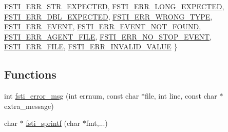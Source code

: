 \begin{DoxyCompactItemize}
\mbox{\hyperlink{fsti-error_8h_a385c44f6fb256e5716a2302a5b940388a4d34aec5d45c4f9a07a2f010034d6280}{F\+S\+T\+I\+\_\+\+E\+R\+R\+\_\+\+S\+T\+R\+\_\+\+E\+X\+P\+E\+C\+T\+ED}}, 
\mbox{\hyperlink{fsti-error_8h_a385c44f6fb256e5716a2302a5b940388a5c988ec210cd1f14e68429a5486becdd}{F\+S\+T\+I\+\_\+\+E\+R\+R\+\_\+\+L\+O\+N\+G\+\_\+\+E\+X\+P\+E\+C\+T\+ED}}, 
\mbox{\hyperlink{fsti-error_8h_a385c44f6fb256e5716a2302a5b940388a8deafa778033a6ec3f07fa31fbca574d}{F\+S\+T\+I\+\_\+\+E\+R\+R\+\_\+\+D\+B\+L\+\_\+\+E\+X\+P\+E\+C\+T\+ED}}, 
\newline
\mbox{\hyperlink{fsti-error_8h_a385c44f6fb256e5716a2302a5b940388a7ff33db1e9336968163833471c1d8efe}{F\+S\+T\+I\+\_\+\+E\+R\+R\+\_\+\+W\+R\+O\+N\+G\+\_\+\+T\+Y\+PE}}, 
\mbox{\hyperlink{fsti-error_8h_a385c44f6fb256e5716a2302a5b940388a22475acef0625db50876279560a18b2f}{F\+S\+T\+I\+\_\+\+E\+R\+R\+\_\+\+E\+V\+E\+NT}}, 
\mbox{\hyperlink{fsti-error_8h_a385c44f6fb256e5716a2302a5b940388a29607c12e78f6d945365852d63397b27}{F\+S\+T\+I\+\_\+\+E\+R\+R\+\_\+\+E\+V\+E\+N\+T\+\_\+\+N\+O\+T\+\_\+\+F\+O\+U\+ND}}, 
\mbox{\hyperlink{fsti-error_8h_a385c44f6fb256e5716a2302a5b940388ae9f4d05515e6c6a028ad4544a1c0bea7}{F\+S\+T\+I\+\_\+\+E\+R\+R\+\_\+\+A\+G\+E\+N\+T\+\_\+\+F\+I\+LE}}, 
\newline
\mbox{\hyperlink{fsti-error_8h_a385c44f6fb256e5716a2302a5b940388affc9edd739f8d19c12a33fa5dfd438a8}{F\+S\+T\+I\+\_\+\+E\+R\+R\+\_\+\+N\+O\+\_\+\+S\+T\+O\+P\+\_\+\+E\+V\+E\+NT}}, 
\mbox{\hyperlink{fsti-error_8h_a385c44f6fb256e5716a2302a5b940388ae5fda67c3971a02352e2c882b38f80ae}{F\+S\+T\+I\+\_\+\+E\+R\+R\+\_\+\+F\+I\+LE}}, 
\mbox{\hyperlink{fsti-error_8h_a385c44f6fb256e5716a2302a5b940388aecf4a87c0022e71eaf6341ed19f0baee}{F\+S\+T\+I\+\_\+\+E\+R\+R\+\_\+\+I\+N\+V\+A\+L\+I\+D\+\_\+\+V\+A\+L\+UE}}
 \}
\end{DoxyCompactItemize}
\subsection*{Functions}
\begin{DoxyCompactItemize}
\item 
int \mbox{\hyperlink{fsti-error_8h_a07bba2015aafadb550151f076c6b7843}{fsti\+\_\+error\+\_\+msg}} (int errnum, const char $\ast$file, int line, const char $\ast$extra\+\_\+message)
\item 
char $\ast$ \mbox{\hyperlink{fsti-error_8h_a43bc036e5103ed01c68a28a583ce7e3b}{fsti\+\_\+sprintf}} (char $\ast$fmt,...)
\end{DoxyCompactItemize}
